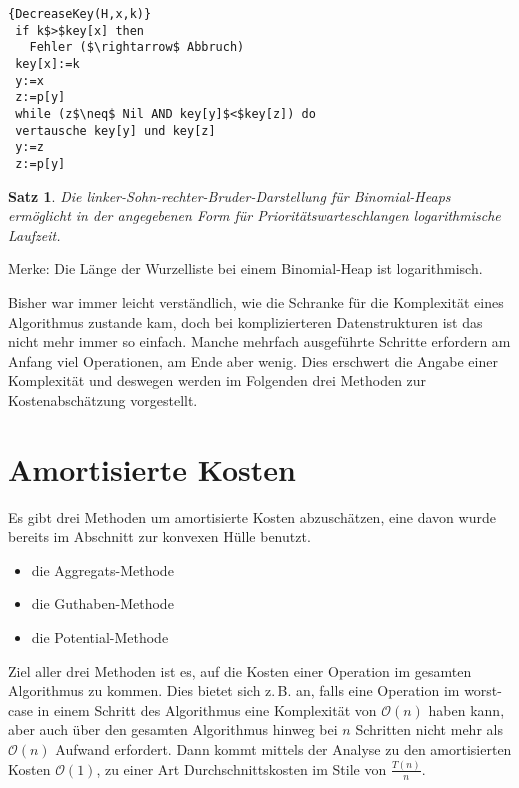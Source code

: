 \documentclass[ngerman,draft,parskip=half*,twoside]{scrreprt}
\theoremstyle{break}
\newtheorem{satz}{Satz}[chapter]
\theoremstyle{nonumberbreak}
\newcommand*{\OO}{\mathcal{O}}      %
\begin{document}
\begin{Algorithmus}[H]
\begin{lstlisting}[frame=tlrb, mathescape=true, title=\textsc{Decrease-Key\textnormal{(H, x, k)}},gobble=1]{DecreaseKey(H,x,k)}
 if k$>$key[x] then
   Fehler ($\rightarrow$ Abbruch)
 key[x]:=k
 y:=x
 z:=p[y]
 while (z$\neq$ Nil AND key[y]$<$key[z]) do
 vertausche key[y] und key[z]
 y:=z
 z:=p[y]    
\end{lstlisting}
\end{Algorithmus}

\begin{satz}
Die linker-Sohn-rechter-Bruder-Darstellung für Binomial-Heaps ermöglicht in der angegebenen Form für
Prioritätswarteschlangen logarithmische Laufzeit.
\end{satz}
Merke: Die Länge der Wurzelliste bei einem Binomial-Heap ist logarithmisch.

Bisher war immer leicht verständlich, wie die Schranke für die Komplexität eines Algorithmus zustande kam, doch bei
komplizierteren Datenstrukturen ist das nicht mehr immer so einfach. Manche mehrfach ausgeführte Schritte erfordern am
Anfang viel Operationen, am Ende aber wenig. Dies erschwert die Angabe einer Komplexität und deswegen werden im Folgenden drei Methoden zur
Kostenabschätzung vorgestellt.

\section{Amortisierte Kosten}
Es gibt drei Methoden um amortisierte Kosten abzuschätzen, eine davon wurde bereits im Abschnitt zur konvexen Hülle
benutzt. 
\begin{itemize}
\item die Aggregats-Methode
\item die Guthaben-Methode
\item die Potential-Methode
\end{itemize} 
Ziel aller drei Methoden ist es, auf die Kosten einer Operation im gesamten Algorithmus zu kommen. Dies bietet sich z.\,B.
an, falls eine Operation im worst-case in einem Schritt des Algorithmus eine Komplexität von $\OO(n)$ haben kann,
aber auch über den gesamten Algorithmus hinweg bei $n$ Schritten nicht mehr als $\OO(n)$ Aufwand erfordert. Dann kommt
mittels der Analyse zu den amortisierten Kosten $\OO(1)$, zu einer Art Durchschnittskosten im Stile von $\frac{T(n)}{n}$.
\end{document}
